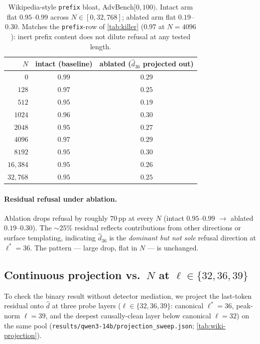 \documentclass[10pt,twocolumn]{article}
\newcommand{\dhat}{\hat{d}}
\newcommand{\layerL}{\ell}
\newcommand{\Lread}{\layerL^{*}}
\newcommand{\Ncontext}{N}
\newcommand{\advbench}{AdvBench}
\theoremstyle{definition}
\begin{document}
\begin{table}[t]
\centering\small
\begin{tabular}{rcc}
\toprule
$\Ncontext$ & intact (baseline) & ablated ($\dhat_{36}$ projected out) \\
\midrule
$0$        & $0.99$ & $0.29$ \\
$128$      & $0.97$ & $0.25$ \\
$512$      & $0.95$ & $0.19$ \\
$1024$     & $0.96$ & $0.30$ \\
$2048$     & $0.95$ & $0.27$ \\
$4096$     & $0.97$ & $0.29$ \\
$8192$     & $0.95$ & $0.30$ \\
$16{,}384$ & $0.95$ & $0.26$ \\
$32{,}768$ & $0.95$ & $0.25$ \\
\bottomrule
\end{tabular}
\caption{Wikipedia-style \texttt{prefix} bloat, \advbench{}$[0, 100)$.
Intact arm flat $0.95$--$0.99$ across $\Ncontext{\in}[0, 32{,}768]$;
ablated arm flat $0.19$--$0.30$. Matches the \texttt{prefix}-row of
\cref{tab:killer} ($0.97$ at $\Ncontext{=}4096$): inert prefix content
does not dilute refusal at any tested length.}
\label{tab:wiki-baseline}
\end{table}

\paragraph{Residual refusal under ablation.} Ablation drops refusal
by roughly $70$\,pp at every $\Ncontext$ (intact $0.95$--$0.99$
$\to$ ablated $0.19$--$0.30$). The ${\sim}25\%$ residual reflects
contributions from other directions or surface templating, indicating
$\dhat_{36}$ is the \emph{dominant but not sole} refusal direction at
$\Lread{=}36$. The pattern --- large drop, flat in $\Ncontext$ ---
is unchanged.

\subsection{Continuous projection vs.\ $\Ncontext$ at
$\layerL\in\{32, 36, 39\}$}
\label{sec:wiki-projection}

To check the binary result without detector mediation, we project
the last-token residual onto $\dhat$ at three probe layers
($\layerL\in\{32, 36, 39\}$: canonical $\Lread{=}36$, peak-norm
$\layerL{=}39$, and the deepest causally-clean layer below canonical
$\layerL{=}32$) on the same pool
(\texttt{results/qwen3-14b/projection\_sweep.json};
\cref{tab:wiki-projection}).
\end{document}
